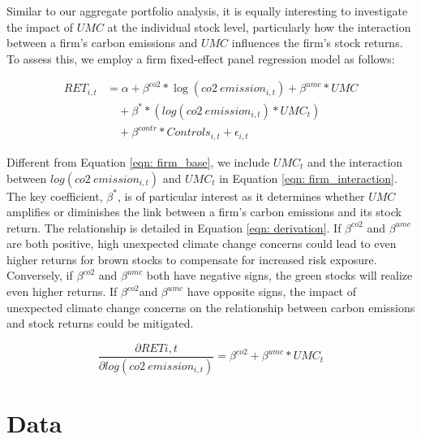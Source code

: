 \documentclass[12pt]{article}
\begin{document}
Similar to our aggregate portfolio analysis, it is equally interesting to investigate the impact of $UMC$ at the individual stock level, particularly how the interaction between a firm's carbon emissions and $UMC$ influences the firm's stock returns. To assess this, we employ a firm fixed-effect panel regression model as follows:

\begin{align}
    \label{eqn: firm_interaction}
    RET_{i, t} &= \alpha + \beta^{co2}*\log(co2 \: emission_{i, t}) + \beta^{umc}*UMC \nonumber \\
               &\quad + \beta^* *(log(co2 \: emission_{i, t})*UMC_{t}) \nonumber \\
               &\quad + \beta^{contr}*Controls_{i, t} + \epsilon_{i, t}
\end{align}

\noindent Different from Equation \ref{eqn: firm_base}, we include $UMC_{t}$ and the interaction between $log(co2 \: emission_{i, t})$ and $UMC_t$ in Equation \ref{eqn: firm_interaction}. The key coefficient, $\beta^*$, is of particular interest as it determines whether $UMC$ amplifies or diminishes the link between a firm's carbon emissions and its stock return. The relationship is detailed in Equation \ref{eqn: derivation}. If $\beta^{co2}$ and $\beta^{umc}$ are both positive, high unexpected climate change concerns could lead to even higher returns for brown stocks to compensate for increased risk exposure. Conversely, if $\beta^{co2}$ and $\beta^{umc}$ both have negative signs, the green stocks will realize even higher returns. If $\beta^{co2}$and $\beta^{umc}$ have opposite signs, the impact of unexpected climate change concerns on the relationship between carbon emissions and stock returns could be mitigated.

\begin{equation}
\label{eqn: derivation}
\frac{\partial RET{i, t}}{\partial log(co2 \: emission_{i, t})} = \beta^{co2} + \beta^{umc}*UMC_{t}
\end{equation}
\section{Data} \label{sec: data}
\end{document}
